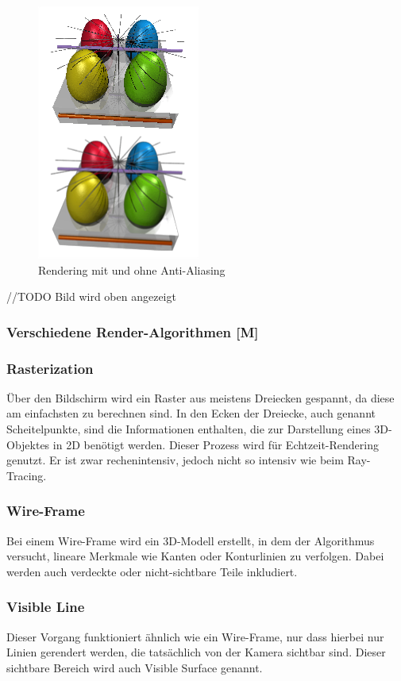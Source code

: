 \begin{figure}
    \centering
    \includegraphics[scale=0.7]{pics/anti-aliasing.png}
    \caption{Rendering mit und ohne Anti-Aliasing \cite{AntiAliasing}}
    \label{fig:impl:anti-aliasing}
\end{figure}
//TODO Bild wird oben angezeigt

\subsubsection{Verschiedene Render-Algorithmen [M]}
\subsubsection{Rasterization}
Über den Bildschirm wird ein Raster aus meistens Dreiecken gespannt, da diese am einfachsten zu berechnen sind. In den Ecken der Dreiecke, auch genannt Scheitelpunkte, sind die Informationen enthalten, die zur Darstellung eines 3D-Objektes in 2D benötigt werden. Dieser Prozess wird für Echtzeit-Rendering genutzt. Er ist zwar rechenintensiv, jedoch nicht so intensiv wie beim Ray-Tracing. \cite{RayTracingRasterization}

\subsubsection{Wire-Frame}
Bei einem Wire-Frame wird ein 3D-Modell erstellt, in dem der Algorithmus versucht, lineare Merkmale wie Kanten oder Konturlinien zu verfolgen. Dabei werden auch verdeckte oder nicht-sichtbare Teile inkludiert. 
\cite{Rendering3DModels} 

\subsubsection{Visible Line}
Dieser Vorgang funktioniert ähnlich wie ein Wire-Frame, nur dass hierbei nur Linien gerendert werden, die tatsächlich von der Kamera sichtbar sind. Dieser sichtbare Bereich wird auch Visible Surface genannt. 
\cite{Rendering3DModels} 

